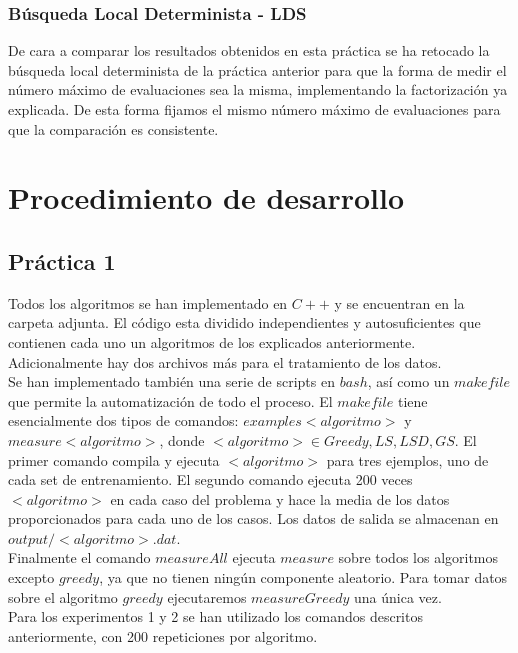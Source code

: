 \documentclass[11pt,a4paper]{article}
\begin{document}
	\subsubsection{ Búsqueda Local Determinista - LDS }
	
	De cara a comparar los resultados obtenidos en esta práctica se ha retocado la búsqueda local determinista de la práctica anterior para que la forma de medir el número máximo de evaluaciones sea la misma, implementando la factorización ya explicada. De esta forma fijamos el mismo número máximo de evaluaciones para que la comparación es consistente. 
	
	\section{ Procedimiento de desarrollo }
	
	\subsection{ Práctica 1 }
	
	Todos los algoritmos se han implementado en $C++$ y se encuentran en la carpeta adjunta. El código esta dividido independientes y autosuficientes que contienen cada uno un algoritmos de los explicados anteriormente. Adicionalmente hay dos archivos más para el tratamiento de los datos. \\
	
	Se han implementado también una serie de scripts en $bash$, así como un $makefile$ que permite la automatización de todo el proceso. El $makefile$ tiene esencialmente dos tipos de comandos: $examples<algoritmo>$ y $measure<algoritmo>$, donde $<algoritmo> \in {Greedy, LS, LSD, GS}$. El primer comando compila y ejecuta $<algoritmo>$ para tres ejemplos, uno de cada set de entrenamiento. El segundo comando ejecuta 200 veces $<algoritmo>$ en cada caso del problema y hace la media de los datos proporcionados para cada uno de los casos. Los datos de salida se almacenan en $output/<algoritmo>.dat$. \\
	
	Finalmente el comando $measureAll$ ejecuta $measure$ sobre todos los algoritmos excepto $greedy$, ya que no tienen ningún componente aleatorio. Para tomar datos sobre el algoritmo $greedy$ ejecutaremos $measureGreedy$ una única vez. \\
	
	Para los experimentos 1 y 2 se han utilizado los comandos descritos anteriormente, con 200 repeticiones por algoritmo. \\
	
\end{document}
